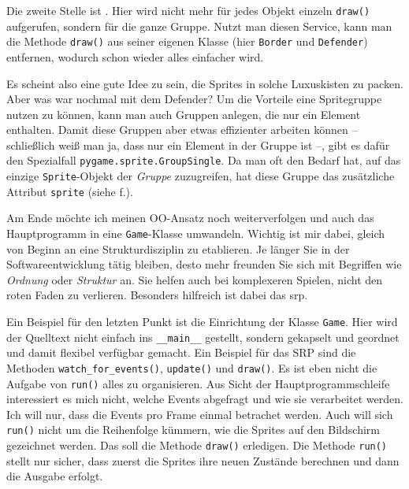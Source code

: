 Die zweite Stelle ist . Hier wird nicht mehr für jedes Objekt einzeln \texttt{draw()} aufgerufen, sondern für die ganze Gruppe. Nutzt man diesen Service, kann man die Methode \texttt{draw()} aus seiner eigenen Klasse (hier \texttt{Border} und \texttt{Defender}) entfernen, wodurch schon wieder alles einfacher wird.

Es scheint also eine gute Idee zu sein, die Sprites in solche Luxuskisten zu packen. Aber was war nochmal mit dem Defender? Um die Vorteile eine Spritegruppe nutzen zu können, kann man auch Gruppen anlegen, die nur ein Element enthalten. Damit diese Gruppen aber etwas effizienter arbeiten können -- schließlich weiß man ja, dass nur ein Element in der Gruppe ist --, gibt es dafür den Spezialfall \texttt{pygame.sprite.GroupSingle}. Da man oft den Bedarf hat, auf das einzige \texttt{Sprite}-Objekt der \emph{Gruppe} zuzugreifen, hat diese Gruppe das zusätzliche Attribut \texttt{sprite} (siehe f.).


Am Ende möchte ich meinen OO-Ansatz noch weiterverfolgen und auch das Hauptprogramm in eine \texttt{Game}-Klasse umwandeln. Wichtig ist mir dabei, gleich von Beginn an eine Strukturdisziplin zu etablieren. Je länger Sie in der Softwareentwicklung tätig bleiben, desto mehr freunden Sie sich mit Begriffen wie \emph{Ordnung} oder \emph{Struktur} an. Sie helfen auch bei komplexeren Spielen, nicht den roten Faden zu verlieren. Besonders hilfreich ist dabei das \Gls{srp}.

\newpage
{}

Ein Beispiel für den letzten Punkt ist die Einrichtung der Klasse \texttt{Game}. Hier wird der Quelltext nicht einfach ins \texttt{\_\_main\_\_} gestellt, sondern gekapselt und geordnet und damit flexibel verfügbar gemacht. Ein Beispiel für das SRP sind die Methoden \texttt{watch\_for\_e\-vents()}, \texttt{update()} und \texttt{draw()}. Es ist eben nicht die Aufgabe von \texttt{run()} alles zu organisieren. Aus Sicht der Hauptprogrammschleife interessiert es mich nicht, welche Events abgefragt und wie sie verarbeitet werden. Ich will nur, dass die Events pro Frame einmal betrachet werden. Auch will sich \texttt{run()} nicht um die Reihenfolge kümmern, wie die Sprites auf den Bildschirm gezeichnet werden. Das soll die Methode \texttt{draw()} erledigen. Die Methode \texttt{run()} stellt nur sicher, dass zuerst die Sprites ihre neuen Zustände berechnen und dann die Ausgabe erfolgt.


